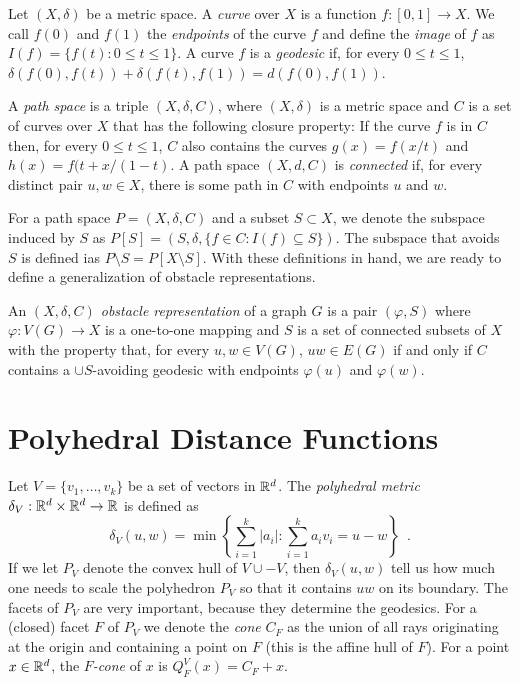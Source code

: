 \documentclass{patmorin}
\begin{document}
Let $(X,\delta)$ be a metric space.  A \emph{curve} over $X$ is a function
$f:[0,1]\to X$.  We call $f(0)$ and $f(1)$ the \emph{endpoints} of the
curve $f$ and define the \emph{image} of $f$ as $I(f)=\{f(t):0\le t\le
1\}$.  A curve $f$ is a \emph{geodesic} if, for every $0\le t\le 1$,
$\delta(f(0),f(t)) + \delta(f(t),f(1)) = d(f(0),f(1))$.  

A \emph{path space} is a triple $(X,\delta,C)$, where $(X,\delta)$ is a
metric space and $C$ is a set of curves over $X$ that has the following
closure property:  If the curve $f$ is in $C$ then, for every $0\le t\le
1$, $C$ also contains the curves $g(x)=f(x/t)$ and $h(x)=f(t+x/(1-t)$.
A path space $(X,d,C)$ is \emph{connected} if, for every distinct pair
$u,w\in X$, there is some path in $C$ with endpoints $u$ and $w$.

For a path space $P=(X,\delta,C)$ and a subset $S\subset X$, we denote the
subspace induced by $S$ as $P[S]=(S,\delta,\{f\in C:I(f)\subseteq S\})$.  The
subspace that avoids $S$ is defined ias $P\setminus S = P[X\setminus S]$.
With these definitions in hand, we are ready to define a generalization
of obstacle representations.

\begin{defn}
An \emph{$(X,\delta,C)$ obstacle representation} of a graph $G$ is a pair
$(\varphi, S)$ where $\varphi:V(G)\to X$ is a one-to-one mapping and
$S$ is a set of connected subsets of $X$ with the property that, for
every $u,w\in V(G)$, $uw\in E(G)$ if and only if $C$ contains a $\cup
S$-avoiding geodesic with endpoints $\varphi(u)$ and $\varphi(w)$.
\end{defn}

\section{Polyhedral Distance Functions}

Let $V=\{v_1,\ldots,v_k\}$ be a set of vectors in $\mathbb{R}^d$.
The \emph{polyhedral metric} $\delta_V:\mathbb{R}^d\times\mathbb{R}^d\to\mathbb{R}$ is defined as
\[
  \delta_V(u,w) = \min\left\{\sum_{i=1}^{k}|a_i| : 
      \sum_{i=1}^k a_iv_i = u-w \right\} \enspace .
\]
If we let $P_V$ denote the convex hull of $V\cup -V$, then $\delta_V(u,w)$
tell us how much one needs to scale the polyhedron $P_V$ so that it
contains $uw$ on its boundary.  The facets of $P_V$ are very important,
because they determine the geodesics.  For a (closed) facet $F$ of $P_V$
we denote the \emph{cone} $C_F$ as the union of all rays originating at
the origin and containing a point on $F$ (this is the affine hull of $F$).
For a point $x\in\mathbb{R}^d$, the \emph{$F$-cone} of $x$ is $Q^V_F(x)=C_F+x$.
\end{document}
